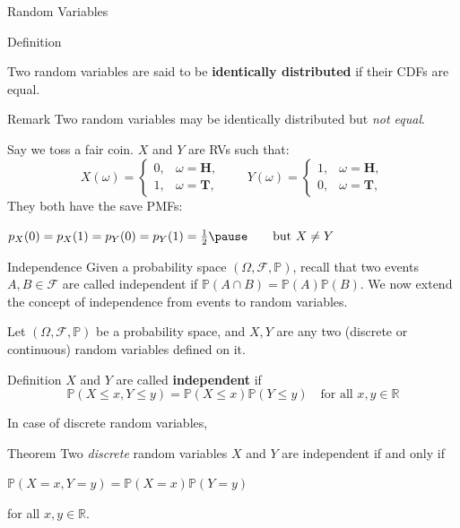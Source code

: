 \documentclass{beamer}
\newcommand{\R}{\mathbb{R}}
\newcommand{\PP}{\mathbb{P}}
\newcommand{\F}{\mathcal{F}}
\begin{document}
\begin{frame}{Random Variables}
\begin{block}{Definition}
   
Two random variables are said to be \textbf{identically distributed} if their
CDFs are equal.

    
\end{block}\pause

\begin{block}{Remark}
    Two random variables may be identically distributed but \textit{not equal}.
\end{block}
\begin{example}
    Say we toss a fair coin. $X$ and $Y$ are RVs such that:
    \[
X(\omega)=\begin{cases}
    0,&\omega=\textbf{H},\\
    1,&\omega=\textbf{T},
\end{cases}\qquad
Y(\omega)=\begin{cases}
    1,&\omega=\textbf{H},\\
    0,&\omega=\textbf{T},
\end{cases}\]
\pause They both have the save PMFs:
\begin{center}
    $p_X(0)=p_X(1)=p_Y(0)=p_Y(1)=\frac{1}{2}\pause\qquad \text{but }X\ne Y$
\end{center}
\end{example}

\end{frame}


\begin{frame}{Independence}
    Given a probability space \( (\Omega, \F, \PP) \), recall that two events \( A, B \in \F \) are called independent if \( \PP(A \cap B) = \PP(A)\PP(B) \). We now extend the concept of independence from events to random variables.\pause

    Let $(\Omega, \F, \PP)$ be a probability space, and $X, Y$ are any two (discrete or continuous) random variables defined on it.\pause

\begin{block}{Definition}
   \( X \) and \( Y \) are called \textbf{independent} if
\[ \PP(X \le x, Y \le y) = \PP(X \le x)\PP(Y \le y) \quad \text{for all } x,y\in\R\]
\end{block}
\pause In case of discrete random variables,


\begin{block}{Theorem}
  Two \textit{discrete} random variables \( X \) and \( Y \) are independent if and only if
\begin{center}
    $\PP(X = x, Y = y) = \PP(X = x)\PP(Y = y)$
\end{center}
for all \( x, y \in \mathbb{R} \).
    
\end{block}


\end{frame}
\end{document}

